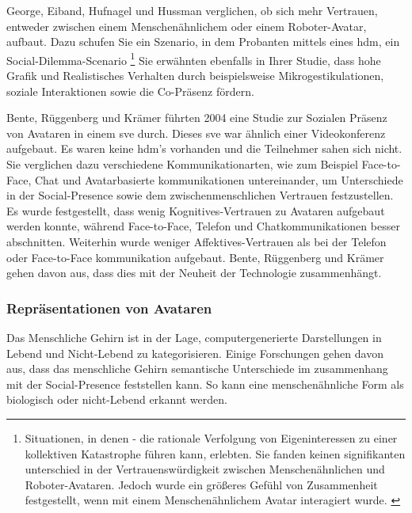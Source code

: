 \documentclass[a4paper,11pt]{article}%
\renewcommand{\\}{\vspace*{0.5\baselineskip} \newline}
\begin{document}
{George, Eiband, Hufnagel und Hussman verglichen, ob sich mehr Vertrauen, entweder zwischen einem Menschenähnlichem oder einem Roboter-Avatar, aufbaut. Dazu schufen Sie ein Szenario, in dem Probanten mittels eines \ac{hdm}, ein Social-Dilemma-Scenario  \footnote{Situationen, in denen - die rationale Verfolgung von Eigeninteressen zu einer kollektiven Katastrophe führen kann, erlebten. Sie fanden keinen signifikanten unterschied in der Vertrauenswürdigkeit zwischen Menschenähnlichen und Roboter-Avataren. Jedoch wurde ein größeres Gefühl von Zusammenheit festgestellt, wenn mit einem Menschenähnlichem Avatar interagiert wurde. \citep{kerr1983motivation}}
Sie erwähnten ebenfalls in Ihrer Studie, dass hohe Grafik und Realistisches Verhalten durch beispielsweise Mikrogestikulationen, soziale Interaktionen sowie die Co-Präsenz fördern. \citep{george2018trusting}

Bente, Rüggenberg und Krämer führten 2004 eine Studie zur Sozialen Präsenz von Avataren in einem \ac{sve} durch. Dieses \ac{sve} war ähnlich einer Videokonferenz aufgebaut. Es waren keine \ac{hdm}'s vorhanden und die Teilnehmer sahen sich nicht. Sie verglichen dazu verschiedene Kommunikationarten, wie zum Beispiel Face-to-Face, Chat und Avatarbasierte kommunikationen untereinander, um Unterschiede in der Social-Presence sowie dem zwischenmenschlichen Vertrauen festzustellen.
Es wurde festgestellt, dass wenig Kognitives-Vertrauen zu Avataren aufgebaut werden konnte, während Face-to-Face, Telefon und Chatkommunikationen besser abschnitten. Weiterhin wurde weniger Affektives-Vertrauen als bei der Telefon oder Face-to-Face kommunikation aufgebaut.
Bente, Rüggenberg und Krämer gehen davon aus, dass dies mit der Neuheit der Technologie zusammenhängt. \citep[p.54-59]{bente2004social}
			
\subsubsection{Repräsentationen von Avataren}

Das Menschliche Gehirn ist in der Lage, computergenerierte Darstellungen in \flqq Lebend und Nicht-Lebend \frqq zu kategorisieren. Einige Forschungen gehen davon aus, dass das menschliche Gehirn semantische Unterschiede im zusammenhang mit der Social-Presence feststellen kann. So kann eine menschenähnliche Form als biologisch oder nicht-Lebend erkannt werden. 

}
\end{document}
